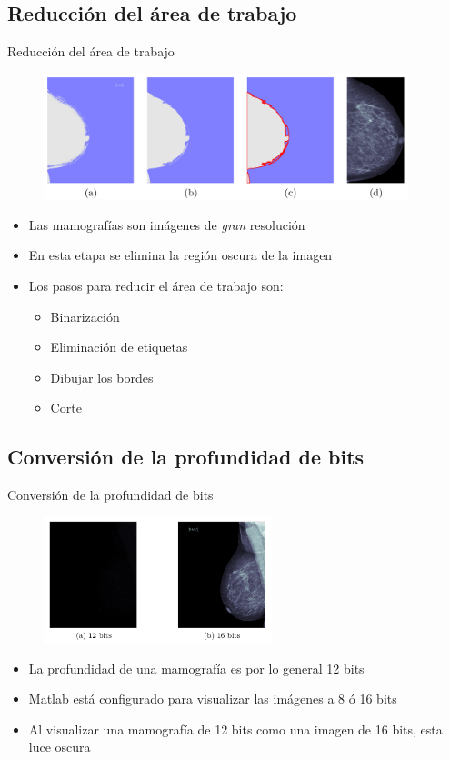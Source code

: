 \documentclass{beamer}
\begin{document}
\subsection{Reducción del área de trabajo}
\begin{frame}{Reducción del área de trabajo}
\transdissolve
  \pause
  \begin{figure}
    \centering
     \includegraphics[height=3.66cm]{images/one.png}
  \end{figure}
  \pause
  \begin{itemize}[<+-| alert@+>]
    \item Las mamografías son imágenes de \textit{gran} resolución
    \item En esta etapa se elimina la región oscura de la imagen
    \item Los pasos para reducir el área de trabajo son:
    \begin{itemize}[<+-| alert@+>]
        \item Binarización
        \item Eliminación de etiquetas
        \item Dibujar los bordes
        \item Corte
    \end{itemize}
  \end{itemize}
\end{frame}

\subsection{Conversión de la profundidad de bits}
\begin{frame}{Conversión de la profundidad de bits}
\transdissolve
  \pause
  \begin{figure}
    \centering
     \includegraphics[height=3.66cm]{images/two.png}
  \end{figure}
  \pause
  \begin{itemize}[<+-| alert@+>]
    \item La profundidad de una mamografía es por lo general 12 bits
    \item Matlab está configurado para visualizar las imágenes a 8 ó 16 bits
    \item Al visualizar una mamografía de 12 bits como una imagen de 16 bits, esta luce oscura
  \end{itemize}
\end{frame}
\end{document}
